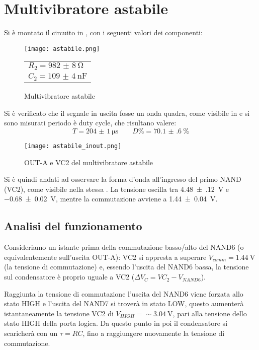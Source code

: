 \section{Multivibratore astabile}
Si è montato il circuito in , con i seguenti valori dei componenti:

\begin{figure}[H]
	\begin{minipage}{0.8\textwidth}
		\centering
		\texttt{[image: astabile.png]}
		\caption{Multivibratore astabile}
		\label{astab_sch}
	\end{minipage}
	\begin{minipage}{0.1\textwidth}
		\begin{tabular}{l}
			$R_2 = \SI{982(8)}{\ohm}$\\
			$C_2 = \SI{109(4)}{\nano \farad}$
		\end{tabular}
	\end{minipage}
\end{figure}

Si è verificato che il segnale in uscita fosse un onda quadra, come visibile in  e si sono misurati periodo è duty cycle, che risultano valere:
$$T = \SI{204(1)}{\micro \second} \qquad D\% = \SI{70.1(6)}{\%}$$

\begin{figure}[H]
	\centering
	\texttt{[image: astabile\_inout.png]}
	\caption{OUT-A e VC2 del multivibratore astabile}
	\label{astab_osc}
\end{figure}

Si è quindi andati ad osservare la forma d'onda all'ingresso del primo NAND (VC2), come visibile nella stessa .
La tensione oscilla tra \SI{4.48(12)}{\volt} e \SI{-0.68(2)}{\volt}, mentre la commutazione avviene a \SI{1.44(4)}{\volt}.

\subsection{Analisi del funzionamento}

Consideriamo un istante prima della commutazione basso/alto del NAND6 (o equivalentemente sull'uscita OUT-A): VC2 si appresta a superare $V_{comm}=\SI{1.44}{\volt}$ (la tensione di commutazione) e, essendo l'uscita del NAND6 bassa, la tensione sul condensatore è proprio uguale a VC2 ($\Delta V_C = VC_2 - V_{NAND6}$).

Raggiunta la tensione di commutazione l'uscita del NAND6 viene forzata allo stato HIGH e l'uscita del NAND7 si troverà in stato LOW, questo aumenterà istantaneamente la tensione VC2 di $V_{HIGH}=\sim \SI{3.04}{\volt}$, pari alla tensione dello stato HIGH della porta logica. Da questo punto in poi il condensatore si scaricherà con un $\tau = RC$, fino a raggiungere nuovamente la tensione di commutazione.

